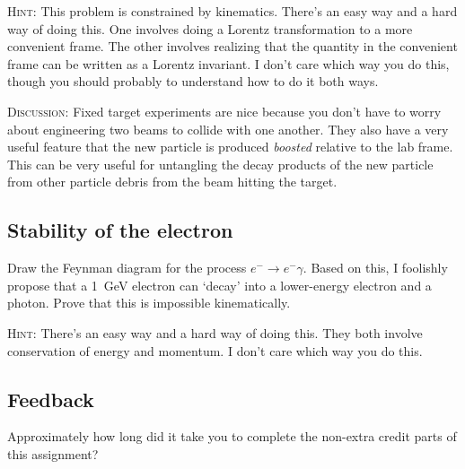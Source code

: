 \documentclass[12pt]{article}
\numberwithin{equation}{section}    %
\begin{document}
\textsc{Hint}: This problem is constrained by kinematics. There's an easy way and a hard way of doing this. One involves doing a Lorentz transformation to a more convenient frame. The other involves realizing that the quantity in the convenient frame can be written as a Lorentz invariant. I don't care which way you do this, though you should probably to understand how to do it both ways. 

\textsc{Discussion}: Fixed target experiments are nice because you don't have to worry about engineering two beams to collide with one another. They also have a very useful feature that the new particle is produced \emph{boosted} relative to the lab frame. This can be very useful for untangling the decay products of the new particle from other  particle debris from the beam hitting the target.


%
%





\subsection{Stability of the electron}

Draw the Feynman diagram for the process $e^- \to e^- \gamma$. Based on this, I foolishly propose that a 1~GeV electron can `decay' into a lower-energy electron and a photon. Prove that this is impossible kinematically. 

\textsc{Hint}: There's an easy way and a hard way of doing this. They both involve conservation of energy and momentum. I don't care which way you do this.


\subsection{Feedback}

Approximately how long did it take you to complete the non-extra credit parts of this assignment?
\end{document}
